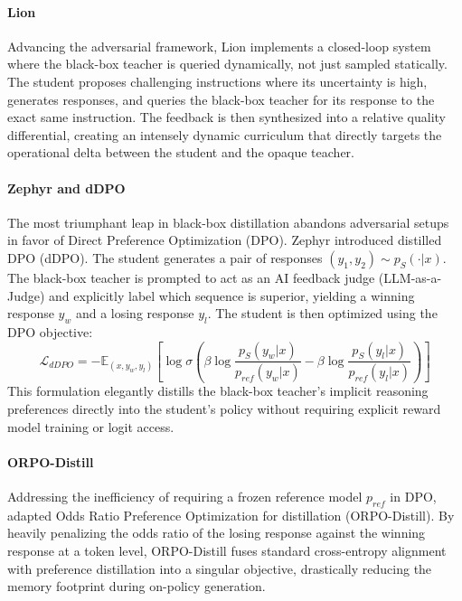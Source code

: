 \documentclass{article} %
\begin{document}
\paragraph{Lion}
Advancing the adversarial framework, Lion \citep{2310.01382} implements a closed-loop system where the black-box teacher is queried dynamically, not just sampled statically. The student proposes challenging instructions where its uncertainty is high, generates responses, and queries the black-box teacher for its response to the exact same instruction. The feedback is then synthesized into a relative quality differential, creating an intensely dynamic curriculum that directly targets the operational delta between the student and the opaque teacher.

\paragraph{Zephyr and dDPO}
The most triumphant leap in black-box distillation abandons adversarial setups in favor of Direct Preference Optimization (DPO). Zephyr \citep{2310.06694} introduced distilled DPO (dDPO). The student generates a pair of responses $(y_1, y_2) \sim p_S(\cdot|x)$. The black-box teacher is prompted to act as an AI feedback judge (LLM-as-a-Judge) and explicitly label which sequence is superior, yielding a winning response $y_w$ and a losing response $y_l$. The student is then optimized using the DPO objective:
\begin{equation}
    \mathcal{L}_{dDPO} = - \mathbb{E}_{(x, y_w, y_l)} \left[ \log \sigma \left( \beta \log \frac{p_S(y_w|x)}{p_{ref}(y_w|x)} - \beta \log \frac{p_S(y_l|x)}{p_{ref}(y_l|x)} \right) \right]
\end{equation}
This formulation elegantly distills the black-box teacher's implicit reasoning preferences directly into the student's policy without requiring explicit reward model training or logit access.

\paragraph{ORPO-Distill}
Addressing the inefficiency of requiring a frozen reference model $p_{ref}$ in DPO, \citet{2509.25100} adapted Odds Ratio Preference Optimization for distillation (ORPO-Distill). By heavily penalizing the odds ratio of the losing response against the winning response at a token level, ORPO-Distill fuses standard cross-entropy alignment with preference distillation into a singular objective, drastically reducing the memory footprint during on-policy generation.
\end{document}
